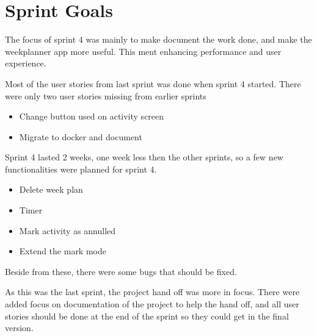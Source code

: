\section{Sprint Goals}
The focus of sprint 4 was mainly to make document the work done, and make the weekplanner app more useful. This ment enhancing performance and user experience. 

Most of the user stories from last sprint was done when sprint 4 started. There were only two user stories missing from earlier sprints
\begin{itemize}
    \item Change button used on activity screen
    \item Migrate to docker and document
\end{itemize}

Sprint 4 lasted 2 weeks, one week less then the other sprints, so a few new functionalities were planned for sprint 4. 
\begin{itemize}
    \item Delete week plan
    \item Timer
    \item Mark activity as annulled
    \item Extend the mark mode
\end{itemize}

Beside from these, there were some bugs that should be fixed. 

As this was the last sprint, the project hand off was more in focus. There were added focus on documentation of the project to help the hand off, and all user stories should be done at the end of the sprint so they could get in the final version.